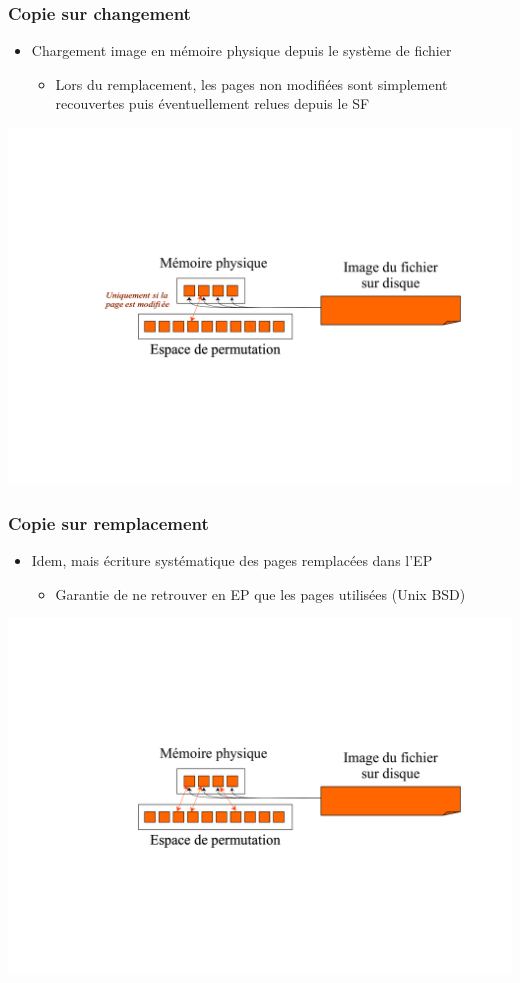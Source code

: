\begin{frame}
\frametitle{Copie sur changement}
\begin{itemize}
\item Chargement image en mémoire physique depuis le système de fichier
\begin{itemize}
\item Lors du remplacement, les pages non modifiées sont simplement recouvertes puis éventuellement relues depuis le SF
\end{itemize}
\end{itemize}
\includegraphics[width=\textwidth]{../illustration/mapping_copie_changement.pdf}
\end{frame}


\begin{frame}
\frametitle{Copie sur remplacement}
\begin{itemize}
\item Idem, mais écriture systématique des pages remplacées dans l'EP
\begin{itemize}
\item Garantie de ne retrouver en EP que les pages utilisées (Unix BSD)
\end{itemize}
\end{itemize}
\includegraphics[width=.8\textwidth]{../illustration/mapping_copie_remplacement.pdf}
\end{frame}


